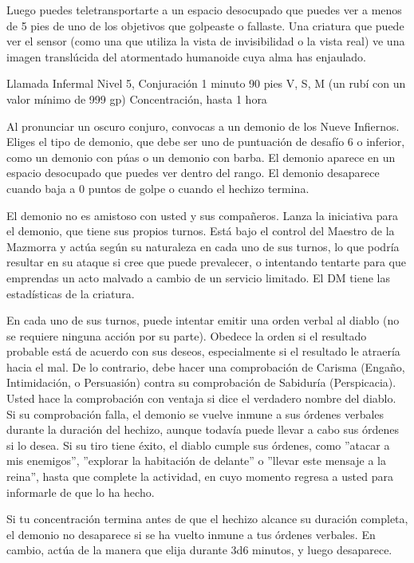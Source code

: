 \documentclass[a4paper,twocolumn,openany,10pt]{dndbook}
\begin{document}
Luego puedes teletransportarte a un espacio desocupado que puedes ver a menos de 5 pies de uno de los objetivos que golpeaste o fallaste. Una criatura que puede ver el sensor (como una que utiliza la vista de invisibilidad o la vista real) ve una imagen translúcida del atormentado humanoide cuya alma has enjaulado. 

\spellheader%
	{Llamada Infermal}
	{Nivel 5, Conjuración}
	{1 minuto}
	{90 pies}
	{V, S, M (un rubí con un valor mínimo de 999 gp)}
	{Concentración, hasta 1 hora}
	
	Al pronunciar un oscuro conjuro, convocas a un demonio de los Nueve Infiernos. Eliges el tipo de demonio, que debe ser uno
	de puntuación de desafío 6 o inferior, como un demonio con púas o un demonio con barba. El demonio aparece en un espacio
	desocupado que puedes ver dentro del rango. El demonio desaparece cuando baja a 0 puntos de golpe o cuando el hechizo
	termina.
	
	El demonio no es amistoso con usted y sus compañeros. Lanza la iniciativa para el demonio, que tiene sus propios turnos.
	Está bajo el control del Maestro de la Mazmorra y actúa según su naturaleza en cada uno de sus turnos, lo que podría
	resultar en su ataque si cree que puede prevalecer, o intentando tentarte para que emprendas un acto malvado a cambio de un
	servicio limitado. El DM tiene las estadísticas de la criatura.
	
	En cada uno de sus turnos, puede intentar emitir una orden verbal al diablo (no se requiere ninguna acción por su parte).
	Obedece la orden si el resultado probable está de acuerdo con sus deseos, especialmente si el resultado le atraería hacia el
	mal. De lo contrario, debe hacer una comprobación de Carisma (Engaño, Intimidación, o Persuasión) contra su comprobación de
	Sabiduría (Perspicacia). Usted hace la comprobación con ventaja si dice el verdadero nombre del diablo. Si su comprobación
	falla, el demonio se vuelve inmune a sus órdenes verbales durante la duración del hechizo, aunque todavía puede llevar a
	cabo sus órdenes si lo desea. Si su tiro tiene éxito, el diablo cumple sus órdenes, como ''atacar a mis enemigos'',
	''explorar la habitación de delante'' o ''llevar este mensaje a la reina'', hasta que complete la actividad, en cuyo momento
	regresa a usted para informarle de que lo ha hecho.
	
	Si tu concentración termina antes de que el hechizo alcance su duración completa, el demonio no desaparece si se ha vuelto
	inmune a tus órdenes verbales. En cambio, actúa de la manera que elija durante 3d6 minutos, y luego desaparece.
	
\end{document}
